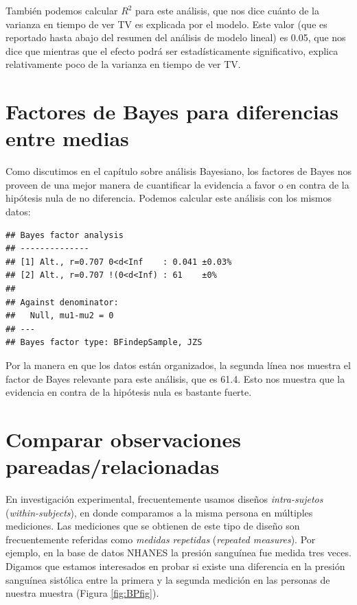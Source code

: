 \documentclass[
  12pt,
]{book}
\begin{document}
También podemos calcular \(R^2\) para este análisis, que nos dice cuánto de la varianza en tiempo de ver TV es explicada por el modelo. Este valor (que es reportado hasta abajo del resumen del análisis de modelo lineal) es 0.05, que nos dice que mientras que el efecto podrá ser estadísticamente significativo, explica relativamente poco de la varianza en tiempo de ver TV.

\hypertarget{factores-de-bayes-para-diferencias-entre-medias}{%
\section{Factores de Bayes para diferencias entre medias}\label{factores-de-bayes-para-diferencias-entre-medias}}

Como discutimos en el capítulo sobre análisis Bayesiano, los factores de Bayes nos proveen de una mejor manera de cuantificar la evidencia a favor o en contra de la hipótesis nula de no diferencia. Podemos calcular este análisis con los mismos datos:

\begin{verbatim}
## Bayes factor analysis
## --------------
## [1] Alt., r=0.707 0<d<Inf    : 0.041 ±0.03%
## [2] Alt., r=0.707 !(0<d<Inf) : 61    ±0%
## 
## Against denominator:
##   Null, mu1-mu2 = 0 
## ---
## Bayes factor type: BFindepSample, JZS
\end{verbatim}

Por la manera en que los datos están organizados, la segunda línea nos muestra el factor de Bayes relevante para este análisis, que es 61.4. Esto nos muestra que la evidencia en contra de la hipótesis nula es bastante fuerte.

\hypertarget{paired-ttests}{%
\section{Comparar observaciones pareadas/relacionadas}\label{paired-ttests}}

En investigación experimental, frecuentemente usamos diseños \emph{intra-sujetos} (\emph{within-subjects}), en donde comparamos a la misma persona en múltiples mediciones. Las mediciones que se obtienen de este tipo de diseño son frecuentemente referidas como \emph{medidas repetidas} (\emph{repeated measures}). Por ejemplo, en la base de datos NHANES la presión sanguínea fue medida tres veces. Digamos que estamos interesados en probar si existe una diferencia en la presión sanguínea sistólica entre la primera y la segunda medición en las personas de nuestra muestra (Figura \ref{fig:BPfig}).
\end{document}
